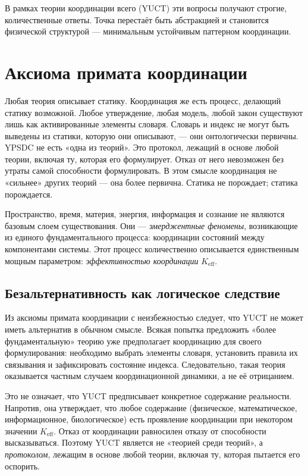 \documentclass[12pt,a4paper]{article}
\newcommand{\Keff}{K_{\mathrm{eff}}}
\begin{document}
	В рамках теории координации всего (YUCT) эти вопросы получают строгие, количественные ответы. Точка перестаёт быть абстракцией и становится физической структурой — минимальным устойчивым паттерном координации.
	
	\section*{Аксиома примата координации}
	
	Любая теория описывает статику. Координация же есть процесс, делающий статику возможной. Любое утверждение, любая модель, любой закон существуют лишь как активированные элементы словаря. Словарь и индекс не могут быть выведены из статики, которую они описывают, — они онтологически первичны. YPSDC не есть «одна из теорий». Это протокол, лежащий в основе любой теории, включая ту, которая его формулирует. Отказ от него невозможен без утраты самой способности формулировать. В этом смысле координация не «сильнее» других теорий — она более первична. Статика не порождает; статика порождается.
	
	Пространство, время, материя, энергия, информация и сознание не являются базовым слоем существования. Они — \emph{эмерджентные феномены}, возникающие из единого фундаментального процесса: координации состояний между компонентами системы. Этот процесс количественно описывается единственным мощным параметром: \emph{эффективностью координации} \(\Keff\).
	
	\subsection*{Безальтернативность как логическое следствие}
	
	Из аксиомы примата координации с неизбежностью следует, что YUCT не может иметь альтернатив в обычном смысле. Всякая попытка предложить «более фундаментальную» теорию уже предполагает координацию для своего формулирования: необходимо выбрать элементы словаря, установить правила их связывания и зафиксировать состояние индекса. Следовательно, такая теория оказывается частным случаем координационной динамики, а не её отрицанием.
	
	Это не означает, что YUCT предписывает конкретное содержание реальности. Напротив, она утверждает, что любое содержание (физическое, математическое, информационное, биологическое) есть проявление координации при некотором значении \(\Keff\). Отказ от координации равносилен отказу от способности высказываться. Поэтому YUCT является не «теорией среди теорий», а \emph{протоколом}, лежащим в основе любой теории, включая ту, которая пытается его оспорить.
	
\end{document}

